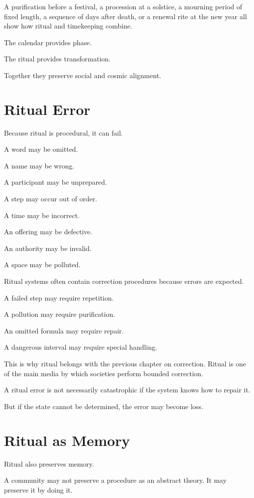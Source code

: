 \documentclass[11pt]{book}
\begin{document}
A purification before a festival, a procession at a solstice, a mourning period of fixed length, a sequence of days after death, or a renewal rite at the new year all show how ritual and timekeeping combine.

The calendar provides phase.

The ritual provides transformation.

Together they preserve social and cosmic alignment.

\section{Ritual Error}

Because ritual is procedural, it can fail.

A word may be omitted.

A name may be wrong.

A participant may be unprepared.

A step may occur out of order.

A time may be incorrect.

An offering may be defective.

An authority may be invalid.

A space may be polluted.

Ritual systems often contain correction procedures because errors are expected.

A failed step may require repetition.

A pollution may require purification.

An omitted formula may require repair.

A dangerous interval may require special handling.

This is why ritual belongs with the previous chapter on correction. Ritual is one of the main media by which societies perform bounded correction.

A ritual error is not necessarily catastrophic if the system knows how to repair it.

But if the state cannot be determined, the error may become loss.

\section{Ritual as Memory}

Ritual also preserves memory.

A community may not preserve a procedure as an abstract theory. It may preserve it by doing it.
\end{document}
